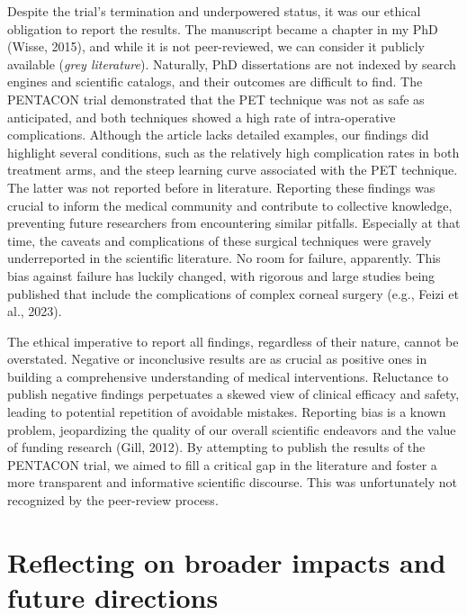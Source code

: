 \documentclass[authordate, reflection,issue]{jote-new-article}
\begin{document}
	Despite the trial's termination and underpowered status, it was our ethical obligation to report the results. The manuscript became a chapter in my PhD (Wisse, 2015), and while it is not peer-reviewed, we can consider it publicly available (\emph{grey literature}). Naturally, PhD dissertations are not indexed by search engines and scientific catalogs, and their outcomes are difficult to find. The PENTACON trial demonstrated that the PET technique was not as safe as anticipated, and both techniques showed a high rate of intra-operative complications. Although the article lacks detailed examples, our findings did highlight several conditions, such as the relatively high complication rates in both treatment arms, and the steep learning curve associated with the PET technique. The latter was not reported before in literature. Reporting these findings was crucial to inform the medical community and contribute to collective knowledge, preventing future researchers from encountering similar pitfalls. Especially at that time, the caveats and complications of these surgical techniques were gravely underreported in the scientific literature. No room for failure, apparently. This bias against failure has luckily changed, with rigorous and large studies being published that include the complications of complex corneal surgery (e.g., Feizi et al., 2023).



	The ethical imperative to report all findings, regardless of their nature, cannot be overstated. Negative or inconclusive results are as crucial as positive ones in building a comprehensive understanding of medical interventions. Reluctance to publish negative findings perpetuates a skewed view of clinical efficacy and safety, leading to potential repetition of avoidable mistakes. Reporting bias is a known problem, jeopardizing the quality of our overall scientific endeavors and the value of funding research (Gill, 2012). By attempting to publish the results of the PENTACON trial, we aimed to fill a critical gap in the literature and foster a more transparent and informative scientific discourse. This was unfortunately not recognized by the peer-review process.



	\section{Reflecting on broader impacts and future directions}
\end{document}
